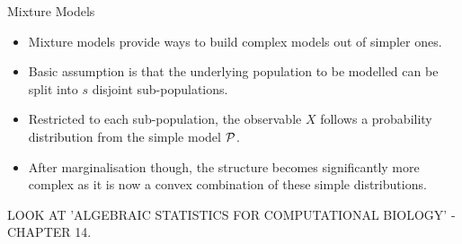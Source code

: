 \begin{frame}{Mixture Models}

    \begin{itemize}
    \item Mixture models provide ways to build complex models out of simpler ones.

    \item Basic assumption is that the underlying population to be modelled can be split into $s$ disjoint sub-populations.

    \item Restricted to each sub-population, the observable $X$ follows a probability distribution from the simple model $\mathcal{P}$.

    \item After marginalisation though, the structure becomes significantly more complex as it is now a convex combination of these simple distributions.

    \end{itemize}

\end{frame}

\begin{frame}{}

    LOOK AT 'ALGEBRAIC STATISTICS FOR COMPUTATIONAL BIOLOGY' - CHAPTER 14.

\end{frame}